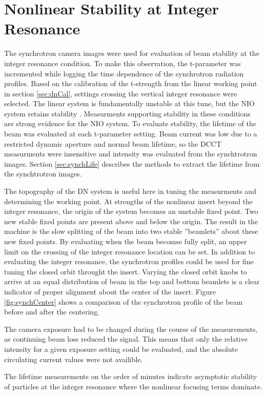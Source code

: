\section{Nonlinear Stability at Integer Resonance} \label{sec:intCross}
The synchrotron camera images were used for evaluation of beam stability at the integer resonance condition. To make this observation, the t-parameter was incremented while logging the time dependence of the synchrotron radiation profiles. Based on the calibration of the t-strength from the linear working point in section \ref{sec:dnCal}, settings crossing the vertical integer resonance were selected. The linear system is fundamentally unstable at this tune, but the NIO system retains stability . Measurments supporting stability in these conditions are strong evidence for the NIO system. To evaluate stability, the lifetime of the beam was evaluated at each t-parameter setting. Beam current was low due to a restricted dynamic aperture and normal beam lifetime, so the DCCT measurments were insensitive and intensity was evaluated from the synchtrotron images. Section \ref{sec:synchLife} describes the methods to extract the lifetime from the synchtrotron images.

The topography of the DN system is useful here in tuning the measurments and determining the working point. At strengths of the nonlinear insert beyond the integer resonance, the origin of the system becomes an unstable fixed point. Two new stable fixed points are present above and below the origin. The result in the machine is the slow splitting of the beam into two stable ”beamlets” about these new fixed points. By evaluating when the beam becomse fully split, an upper limit on the crossing of the integer resonance location can be set. In addition to evaluating the integer resonance, the synchrotron profiles could be used for fine tuning the closed orbit throught the insert. Varying the closed orbit knobs to arrive at an equal distribution of beam in the top and bottom beamlets is a  clear indicator of proper alignment about the center of the insert. Figure \ref{fig:synchCenter} shows a comparison of the synchrotron profile of the beam before and after the centering.

The camera exposure had to be changed during the course of the measurements, as continuing beam loss reduced the signal. This means that only the relative intensity for a given exposure setting could be evaluated, and the absolute circulating current values were not availible. 

The lifetime measurements on the order of minutes indicate asymptotic stability of particles at the integer resonance where the nonlinear focusing terms dominate.
